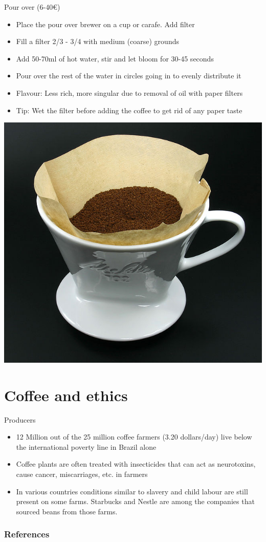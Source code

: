 \documentclass[10pt,graphics,aspectratio=169,table]{beamer}
\begin{document}
\begin{frame}{Pour over (6-40€)}
    \begin{itemize}
        \item Place the pour over brewer on a cup or carafe. Add filter
        \item Fill a filter 2/3 - 3/4 with medium (coarse) grounds
        \item Add 50-70ml of hot water, stir and let bloom for 30-45 seconds
        \item Pour over the rest of the water in circles going in to evenly distribute it
        \item Flavour: Less rich, more singular due to removal of oil with paper filters
        \item Tip: Wet the filter before adding the coffee to get rid of any paper taste
        
    \end{itemize}
    \includegraphics[scale=0.2]{img/645px-Kaffeefilter.jpg} \cite{pourOver}
\end{frame}

\section{Coffee and ethics}
\begin{frame}{Producers}
    \begin{itemize}
    \item 12 Million out of the 25 million coffee farmers (3.20 dollars/day) live below the international poverty line in Brazil alone
    \item Coffee plants are often treated with insecticides that can act as neurotoxins, cause cancer, miscarriages, etc. in farmers
    \item In various countries conditions similar to slavery and child labour are still present on some farms. Starbucks and Nestle are among the companies that sourced beans from those farms. \cite{reportBrazil}
\end{itemize}
\end{frame}


\begin{frame}[allowframebreaks]
        \frametitle{References}
        
        \nocite{*}
        
\end{frame}
\end{document}
